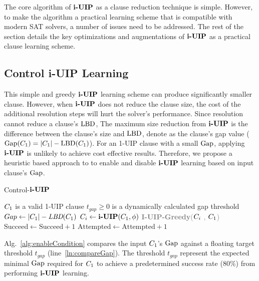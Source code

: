The core algorithm of $\textbf{i-UIP}$ as a clause reduction technique is simple. However, to make the algorithm a practical learning scheme that is compatible with modern SAT solvers, a number of issues need to be addressed. The rest of the section details the key optimizations and augmentations of $\textbf{i-UIP}$ as a practical clause learning scheme.

\subsection{Control i-UIP Learning}
This simple and greedy $\textbf{i-UIP}$ learning scheme can produce significantly smaller clause. However, when $\textbf{i-UIP}$ does not reduce the clause size, the cost of the additional resolution steps will hurt the solver's performance. Since resolution cannot reduce a clause's $\text{LBD}$, The maximum size reduction from $\textbf{i-UIP}$ is the difference between the clause's size and $\text{LBD}$, denote as the clause's gap value ($\text{Gap}(C_{1}) = |C_{1}| - \text{LBD}(C_{1})$). For an 1-UIP clause with a small $\text{Gap}$, applying $\textbf{i-UIP}$ is unlikely to achieve cost effective results. Therefore, we propose a heuristic based approach to to enable and disable $\textbf{i-UIP}$ learning based on input clause's $\text{Gap}$.

\begin{algorithm}[t]
\caption{Control-$\textbf{i-UIP}$}\label{alg:enableCondition}
\begin{algorithmic}[1]
\Require  $C_{1}$ is a valid 1-UIP clause
\Require  $ t_{gap} \ge 0$ is a dynamically calculated gap threshold
    \State $Gap \gets |C_{1}| - \textit{LBD}(C_{1})$
      \label{ln:compareGap}
        \State $C_{i} \gets \textbf{i-UIP}(C_{1}, \phi)$
        \State \textcolor{gray}{\textbf{I-UIP-Greedy}($C_{i}$ , $C_{1}$)}  
        \If {$|\iUIPClause| < |\oneUIPClause|$} 
            \State $\text{Succeed} \gets \text{Succeed}+1$ \label{ln:updateS}
        \EndIf
        \State $\text{Attempted} \gets \text{Attempted}+1$ \label{ln:updateA}
     \EndIf
\EndProcedure
\end{algorithmic}
\end{algorithm}

Alg.~\ref{alg:enableCondition} compares the input $C_{1}$'s $\text{Gap}$ against a floating target threshold $t_{gap}$ (line~\ref{ln:compareGap}). The threshold $t_{gap}$ represent the expected minimal $\text{Gap}$ required for $C_{1}$ to achieve a predetermined success rate (80\%) from performing $\textbf{i-UIP}$ learning. 

